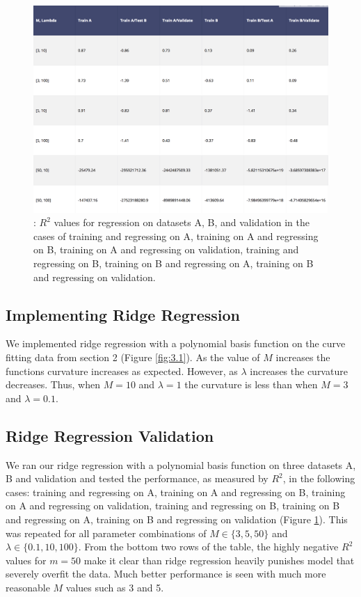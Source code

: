 \documentclass[10pt]{article}
\begin{document}
\begin{figure}
\centering
\includegraphics[width=.5\textwidth,height =0.25\textheight]{ridge_validation_final}
\caption{\label{fig:3.2}: $R^2$ values for regression on datasets A, B, and validation in the cases of training and regressing on A, training on A and regressing on B, training on A and regressing on validation, training and regressing on B, training on B and regressing on A, training on B and regressing on validation.}
\end{figure}



\subsection{Implementing Ridge Regression}

We implemented ridge regression with a polynomial basis function on the curve fitting data from section 2 (Figure \ref{fig:3.1}). As the value of $M$ increases the functions curvature increases as expected. However, as $\lambda$ increases the curvature decreases. Thus, when $M=10$ and $\lambda = 1$ the curvature is less than when $M=3$ and $\lambda = 0.1$. 

\subsection{Ridge Regression Validation}

We ran our ridge regression with a polynomial basis function on three datasets A, B and validation and tested the performance, as measured by $R^2$, in the following cases: training and regressing on A, training on A and regressing on B, training on A and regressing on validation, training and regressing on B, training on B and regressing on A, training on B and regressing on validation (Figure \ref{fig:3.2}). This was repeated for all parameter combinations of $M \in \{3,5,50\}$ and $\lambda \in \{0.1,10,100\}$. From the bottom two rows of the table, the highly negative $R^2$ values for $m=50$ make it clear than ridge regression heavily punishes model that severely overfit the data. Much better performance is seen with much more reasonable $M$ values such as 3 and 5. 
\end{document}
